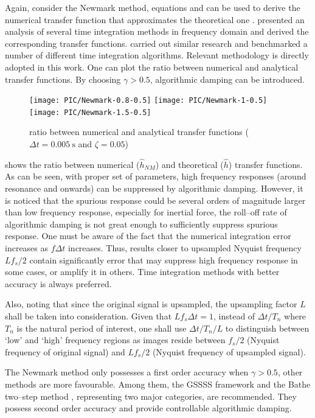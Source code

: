 Again, consider the Newmark method, equations  and  can be used to derive the numerical transfer function that approximates the theoretical one . \citet{Preumont1982} presented an analysis of several time integration methods in frequency domain and derived the corresponding transfer functions. \citet{AriasTrujillo2012} carried out similar research and benchmarked a number of different time integration algorithms. Relevant methodology is directly adopted in this work. One can plot the ratio between numerical and analytical transfer functions. By choosing $\gamma>\num{0.5}$, algorithmic damping can be introduced.
\begin{figure}[htb!]
\centering
\texttt{[image: PIC/Newmark-0.8-0.5]}
\texttt{[image: PIC/Newmark-1-0.5]}
\texttt{[image: PIC/Newmark-1.5-0.5]}
\caption{ratio between numerical and analytical transfer functions ($\Delta{}t=\SI{0.005}{\second}$ and $\zeta=0.05$)}\label{fig:newmark_alg_damping}
\end{figure}
 shows the ratio between numerical ($\hat{h}_{NM}$) and theoretical ($\hat{h}$) transfer functions. As can be seen, with proper set of parameters, high frequency responses (around resonance and onwards) can be suppressed by algorithmic damping. However, it is noticed that the spurious response could be several orders of magnitude larger than low frequency response, especially for inertial force, the roll--off rate of algorithmic damping is not great enough to sufficiently suppress spurious response. One must be aware of the fact that the numerical integration error increases as $f\Delta{}t$ increases. Thus, results closer to upsampled Nyquist frequency $Lf_s/2$ contain significantly error that may suppress high frequency response in some cases, or amplify it in others. Time integration methods with better accuracy is always preferred.

Also, noting that since the original signal is upsampled, the upsampling factor $L$ shall be taken into consideration. Given that $Lf_s\Delta{}t=1$, instead of $\Delta{}t/T_n$ where $T_n$ is the natural period of interest, one shall use $\Delta{}t/T_n/L$ to distinguish between `low' and `high' frequency regions as images reside between $f_s/2$ (Nyquist frequency of original signal) and $Lf_s/2$ (Nyquist frequency of upsampled signal).

The Newmark method only possesses a first order accuracy when $\gamma>0.5$, other methods are more favourable. Among them, the GSSSS framework \citep{Zhou2003,Zhou2006} and the Bathe two--step method \citep{Noh2019}, representing two major categories, are recommended. They possess second order accuracy and provide controllable algorithmic damping.
